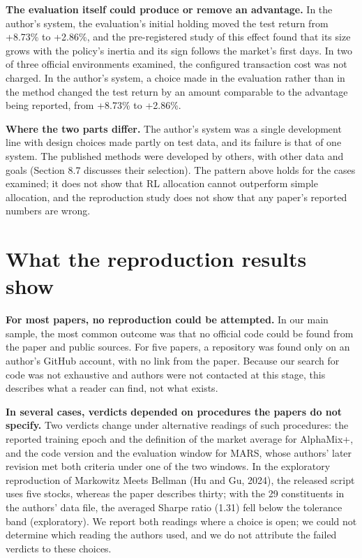 \documentclass[12pt,a4paper]{report}
\begin{document}
\textbf{The evaluation itself could produce or remove an advantage.} In
the author's system, the evaluation's initial holding moved the test
return from +8.73\% to +2.86\%, and the pre-registered study of this
effect found that its size grows with the policy's inertia and its sign
follows the market's first days. In two of three official environments
examined, the configured transaction cost was not charged. In the
author's system, a choice made in the evaluation rather than in the
method changed the test return by an amount comparable to the advantage
being reported, from +8.73\% to +2.86\%.

\textbf{Where the two parts differ.} The author's system was a single
development line with design choices made partly on test data, and its
failure is that of one system. The published methods were developed by
others, with other data and goals (Section 8.7 discusses their
selection). The pattern above holds for the cases examined; it does not
show that RL allocation cannot outperform simple allocation, and the
reproduction study does not show that any paper's reported numbers are
wrong.

\section{What the reproduction results
show}\label{what-the-reproduction-results-show}

\textbf{For most papers, no reproduction could be attempted.} In our
main sample, the most common outcome was that no official code could be
found from the paper and public sources. For five papers, a repository
was found only on an author's GitHub account, with no link from the
paper. Because our search for code was not exhaustive and authors were
not contacted at this stage, this describes what a reader can find, not
what exists.

\textbf{In several cases, verdicts depended on procedures the papers do
not specify.} Two verdicts change under alternative readings of such
procedures: the reported training epoch and the definition of the market
average for AlphaMix+, and the code version and the evaluation window
for MARS, whose authors' later revision met both criteria under one of
the two windows. In the exploratory reproduction of Markowitz Meets
Bellman (Hu and Gu, 2024), the released script uses five stocks, whereas
the paper describes thirty; with the 29 constituents in the authors'
data file, the averaged Sharpe ratio (1.31) fell below the tolerance
band (exploratory). We report both readings where a choice is open; we
could not determine which reading the authors used, and we do not
attribute the failed verdicts to these choices.
\end{document}
